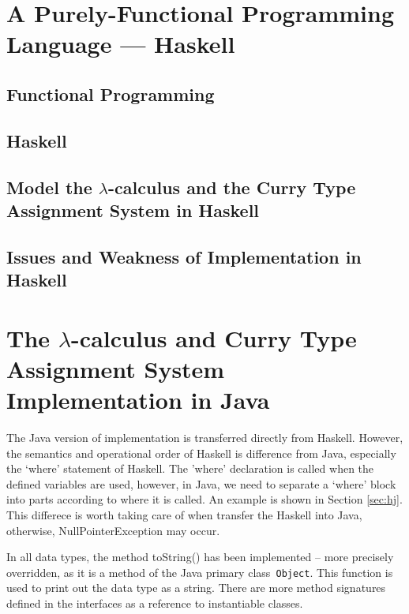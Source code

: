 \documentclass[a4paper,11pt,twoside]{report}
\begin{document}
\chapter{A Purely-Functional Programming Language --- Haskell}

\section{Functional Programming}
\section{Haskell}
\section{Model the $\lambda$-calculus and the Curry Type Assignment System in Haskell}
\section{Issues and Weakness of Implementation in Haskell }



\chapter{The $\lambda$-calculus and Curry Type Assignment System Implementation in Java}
The Java version of implementation is transferred directly from Haskell. However, the semantics and operational order of Haskell is difference from Java, especially the `where' statement of Haskell. The 'where' declaration is called when the defined variables are used, however, in Java, we need to separate a `where' block into parts according to where it is called. An example is shown in Section \ref{sec:hj}. This differece is worth taking care of when transfer the Haskell into Java, otherwise, NullPointerException may occur. 

In all data types, the method toString() has been implemented -- more precisely overridden, as it is a method of the Java primary class\verb| Object|. This function is used to print out the data type as a string. There are more method signatures defined in the interfaces as a reference to instantiable classes. 
\end{document}

